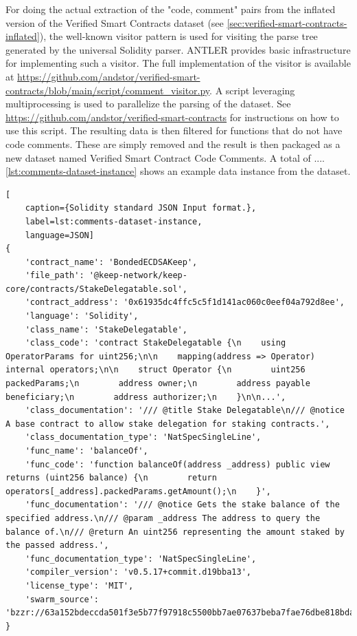 For doing the actual extraction of the "code, comment" pairs from the inflated version of the Verified Smart Contracts dataset (see \cref{sec:verified-smart-contracts-inflated}), the well-known visitor pattern \cite{visitor-pattern} is used for visiting the parse tree generated by the universal Solidity parser. ANTLER provides basic infrastructure for implementing such a visitor. The full implementation of the visitor is available at \url{https://github.com/andstor/verified-smart-contracts/blob/main/script/comment_visitor.py}. A script leveraging multiprocessing is used to parallelize the parsing of the dataset. See \url{https://github.com/andstor/verified-smart-contracts} for instructions on how to use this script. The resulting data is then filtered for functions that do not have code comments. These are simply removed and the result is then packaged as a new dataset named Verified Smart Contract Code Comments. A total of .... \cref{lst:comments-dataset-instance} shows an example data instance from the dataset.



\begin{lstlisting}[
    caption={Solidity standard JSON Input format.},
    label=lst:comments-dataset-instance,
    language=JSON]
{
    'contract_name': 'BondedECDSAKeep',
    'file_path': '@keep-network/keep-core/contracts/StakeDelegatable.sol',
    'contract_address': '0x61935dc4ffc5c5f1d141ac060c0eef04a792d8ee',
    'language': 'Solidity',
    'class_name': 'StakeDelegatable',
    'class_code': 'contract StakeDelegatable {\n    using OperatorParams for uint256;\n\n    mapping(address => Operator) internal operators;\n\n    struct Operator {\n        uint256 packedParams;\n        address owner;\n        address payable beneficiary;\n        address authorizer;\n    }\n\n...',
    'class_documentation': '/// @title Stake Delegatable\n/// @notice A base contract to allow stake delegation for staking contracts.',
    'class_documentation_type': 'NatSpecSingleLine',
    'func_name': 'balanceOf',
    'func_code': 'function balanceOf(address _address) public view returns (uint256 balance) {\n        return operators[_address].packedParams.getAmount();\n    }',
    'func_documentation': '/// @notice Gets the stake balance of the specified address.\n/// @param _address The address to query the balance of.\n/// @return An uint256 representing the amount staked by the passed address.',
    'func_documentation_type': 'NatSpecSingleLine',
    'compiler_version': 'v0.5.17+commit.d19bba13',
    'license_type': 'MIT',
    'swarm_source': 'bzzr://63a152bdeccda501f3e5b77f97918c5500bb7ae07637beba7fae76dbe818bda4'
}  
\end{lstlisting}

